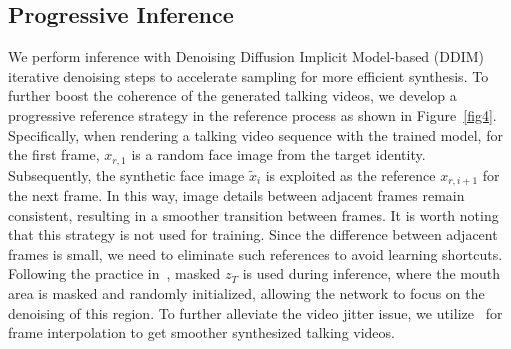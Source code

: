 \documentclass[10pt,twocolumn,letterpaper]{article}
\begin{document}




\subsection{Progressive Inference}
\label{reference}
We perform inference with Denoising Diffusion Implicit Model-based (DDIM)~\cite{song2020denoising} iterative denoising steps to accelerate sampling for more efficient synthesis. 
To further boost the coherence of the generated talking videos, we develop a progressive reference strategy in the reference process as shown in Figure~\ref{fig4}. Specifically, when rendering a talking video sequence with the trained model, for the first frame, $x_{r,1}$ is a random face image from the target identity. Subsequently, the synthetic face image $\tilde{x}_{i}$ is exploited as the reference $x_{r,i+1}$ for the next frame. In this way, image details between adjacent frames remain consistent, resulting in a smoother transition between frames. It is worth noting that this strategy is not used for training. Since the difference between adjacent frames is small, we need to eliminate such references to avoid learning shortcuts. Following the practice in~\cite{rombach2022high}, masked $z_T$ is used during inference, where the mouth area is masked and randomly initialized, allowing the network to focus on the denoising of this region. To further alleviate the video jitter issue, we utilize~\cite{huang2022rife} for frame interpolation to get smoother synthesized talking videos.
 
\end{document}
